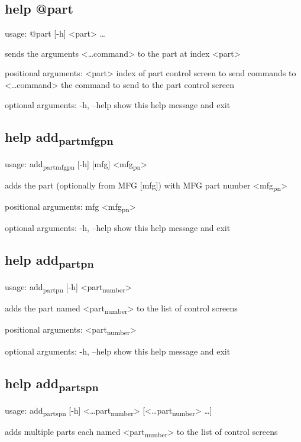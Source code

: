 \documentclass[11pt]{article}
\begin{document}
\subsection{help @part}
\label{sec:org09c4c11}
usage: @part [-h] <part> \ldots{}

sends the arguments <\ldots{}command> to the part at index <part>

positional arguments:
  <part>        index of part control screen to send commands to
  <\ldots{}command>  the command to send to the part control screen

optional arguments:
  -h, --help    show this help message and exit

\subsection{help add\textsubscript{part}\textsubscript{mfg}\textsubscript{pn}}
\label{sec:orgec9763a}
usage: add\textsubscript{part}\textsubscript{mfg}\textsubscript{pn} [-h] [mfg] <mfg\textsubscript{pn}>

adds the part (optionally from MFG [mfg]) with MFG part number <mfg\textsubscript{pn}>

positional arguments:
  mfg
  <mfg\textsubscript{pn}>

optional arguments:
  -h, --help  show this help message and exit

\subsection{help add\textsubscript{part}\textsubscript{pn}}
\label{sec:org6bc7b17}
usage: add\textsubscript{part}\textsubscript{pn} [-h] <part\textsubscript{number}>

adds the part named <part\textsubscript{number}> to the list of control screens

positional arguments:
  <part\textsubscript{number}>

optional arguments:
  -h, --help     show this help message and exit

\subsection{help add\textsubscript{parts}\textsubscript{pn}}
\label{sec:orgc9a9853}
usage: add\textsubscript{parts}\textsubscript{pn} [-h] <\ldots{}part\textsubscript{number}> [<\ldots{}part\textsubscript{number}> \ldots{}]

adds multiple parts each named <part\textsubscript{number}> to the list of control screens
\end{document}
